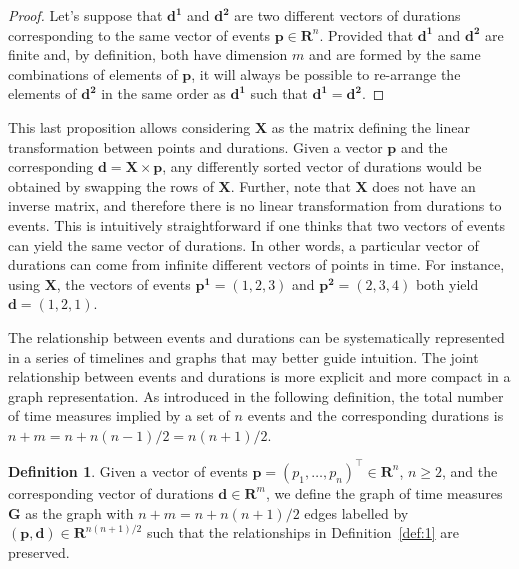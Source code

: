 \documentclass{bmcart}
\theoremstyle{definition}
\newtheorem{definition}{Definition}[section]
\begin{document}
\begin{proof}
 Let's suppose that $\boldsymbol{d^1}$ and $\boldsymbol{d^2}$ are two different
 vectors of durations corresponding to the same vector of events
 $\boldsymbol{p}\in\mathbf{R}^n$. Provided that $\boldsymbol{d^1}$ and
 $\boldsymbol{d^2}$ are finite and, by definition, both have dimension $m$ and are formed by the same combinations of elements of $\boldsymbol{p}$, it will always be possible to re-arrange the elements of $\boldsymbol{d^2}$ in the same order as $\boldsymbol{d^1}$ such that $\boldsymbol{d^1}=\boldsymbol{d^2}$.
\end{proof}

This last proposition allows considering $\boldsymbol{X}$ as the matrix defining
the linear transformation between points and durations. Given a vector
$\boldsymbol{p}$ and the corresponding
$\boldsymbol{d}=\boldsymbol{X}\times\boldsymbol{p}$, any differently sorted
vector of durations would be obtained by swapping the rows of $\boldsymbol{X}$.
Further, note that $\boldsymbol{X}$ does not have an inverse matrix, and
therefore there is no linear transformation from durations to events. This is
intuitively straightforward if one thinks that two vectors of events can yield
the same vector of durations. In other words, a particular vector of durations
can come from infinite different vectors of points in time. For instance, using
$\boldsymbol{X}$, the vectors of events $\boldsymbol{p^1}=(1,2,3)$ and
$\boldsymbol{p^2}=(2,3,4)$ both yield $\boldsymbol{d}=(1,2,1)$. 

The relationship between events and durations can be
systematically represented in a series of timelines and graphs that may better
guide intuition.
The joint relationship between events and durations is more explicit and more
compact in a graph representation. As introduced in the following definition, the total number of time measures implied by a set of $n$ events and the corresponding durations is 
$n+m=n+n(n-1)/2=n(n+1)/2$. 

\begin{definition}
Given a vector of events $\boldsymbol{p}=(p_1,\ldots,p_n)^\top\in\mathbf{R}^n$, $n\geq2$, and the corresponding vector of durations $\boldsymbol{d}\in\mathbf{R}^m$, we define the graph of time measures
 $\boldsymbol{G}$ as the graph with $n+m=n+n(n+1)/2$ edges labelled by
 $(\boldsymbol{p},\boldsymbol{d})\in\mathbf{R}^{n(n+1)/2}$ such that the relationships in Definition~\ref{def:1} are preserved.
 \label{def:2}
\end{definition}
\end{document}
